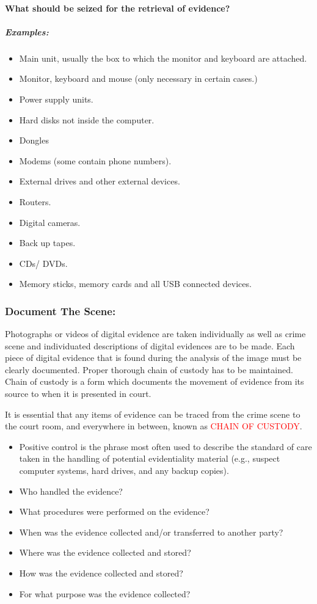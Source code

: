 \documentclass[british]{article}
\begin{document}
\paragraph{What should be seized for the retrieval of evidence?}

\subparagraph{Examples:}
\begin{itemize}
\item Main unit, usually the box to which the monitor and keyboard are attached. 
\item Monitor, keyboard and mouse (only necessary in certain cases.) 
\item Power supply units. 
\item Hard disks not inside the computer. 
\item Dongles 
\item Modems (some contain phone numbers). 
\item External drives and other external devices. 
\item Routers. 
\item Digital cameras. 
\item Back up tapes. 
\item CDs/ DVDs. 
\item Memory sticks, memory cards and all USB connected devices. 
\end{itemize}

\subsubsection{Document The Scene:}

Photographs or videos of digital evidence are taken individually as
well as crime scene and individuated descriptions of digital evidences
are to be made. Each piece of digital evidence that is found during
the analysis of the image must be clearly documented. Proper thorough
chain of custody has to be maintained. Chain of custody is a form
which documents the movement of evidence from its source to when it
is presented in court.

It is essential that any items of evidence can be traced from the
crime scene to the court room, and everywhere in between, known as
\textcolor{red}{CHAIN OF CUSTODY}. 
\begin{itemize}
\item Positive control is the phrase most often used to describe the standard
of care taken in the handling of potential evidentiality material
(e.g., suspect computer systems, hard drives, and any backup copies). 
\item Who handled the evidence? 
\item What procedures were performed on the evidence? 
\item When was the evidence collected and/or transferred to another party? 
\item Where was the evidence collected and stored? 
\item How was the evidence collected and stored? 
\item For what purpose was the evidence collected? 
\end{itemize}
\end{document}
